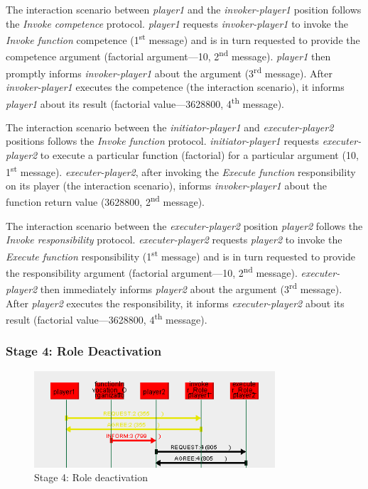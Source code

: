 The {} interaction scenario between \textit{player1} and the \textit{invoker-player1} position follows the \textit{Invoke competence} protocol.
\textit{player1} requests \textit{invoker-player1} to invoke the \textit{Invoke function} competence (1\textsuperscript{st} message) and is in turn requested to provide the competence argument (factorial argument---10, 2\textsuperscript{nd} message).
\textit{player1} then promptly informs \textit{invoker-player1} about the argument (3\textsuperscript{rd} message).
After \textit{invoker-player1} executes the competence (the {} interaction scenario), it informs \textit{player1} about its result (factorial value---3628800, 4\textsuperscript{th} message).

The {} interaction scenario between the \textit{initiator-player1} and \textit{executer-player2} positions follows the \textit{Invoke function} protocol.
\textit{initiator-player1} requests \textit{executer-player2} to execute a particular function (factorial) for a particular argument (10, 1\textsuperscript{st} message).
\textit{executer-player2}, after invoking the \textit{Execute function} responsibility on its player (the {} interaction scenario), informs \textit{invoker-player1} about the function return value (3628800, 2\textsuperscript{nd} message).

The {} interaction scenario between the \textit{executer-player2} position \textit{player2} follows the \textit{Invoke responsibility} protocol.
\textit{executer-player2} requests \textit{player2} to invoke the \textit{Execute function} responsibility (1\textsuperscript{st} message) and is in turn requested to provide the responsibility argument (factorial argument---10, 2\textsuperscript{nd} message).
\textit{executer-player2} then immediately informs \textit{player2} about the argument (3\textsuperscript{rd} message).
After \textit{player2} executes the responsibility, it informs \textit{executer-player2} about its result (factorial value---3628800, 4\textsuperscript{th} message).

\subsubsection*{Stage 4: Role Deactivation}

\begin{figure}[H]
	\centering
	\includegraphics[width=0.8\textwidth]{images/examples/example1-stage4.png}
	\caption{Stage 4: Role deactivation}
	\label{figure:example1-stage4}
\end{figure}

